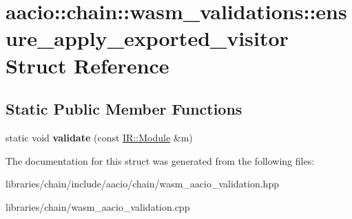 \hypertarget{structaacio_1_1chain_1_1wasm__validations_1_1ensure__apply__exported__visitor}{}\section{aacio\+:\+:chain\+:\+:wasm\+\_\+validations\+:\+:ensure\+\_\+apply\+\_\+exported\+\_\+visitor Struct Reference}
\label{structaacio_1_1chain_1_1wasm__validations_1_1ensure__apply__exported__visitor}
\subsection*{Static Public Member Functions}
\begin{DoxyCompactItemize}
\item 
\mbox{\label{structaacio_1_1chain_1_1wasm__validations_1_1ensure__apply__exported__visitor_ac5cbf8f1940b23cd4ab40e59d3c6b4ef}} 
static void {\bfseries validate} (const \mbox{\hyperlink{struct_i_r_1_1_module}{I\+R\+::\+Module}} \&m)
\end{DoxyCompactItemize}


The documentation for this struct was generated from the following files\+:\begin{DoxyCompactItemize}
\item 
libraries/chain/include/aacio/chain/wasm\+\_\+aacio\+\_\+validation.\+hpp\item 
libraries/chain/wasm\+\_\+aacio\+\_\+validation.\+cpp\end{DoxyCompactItemize}
